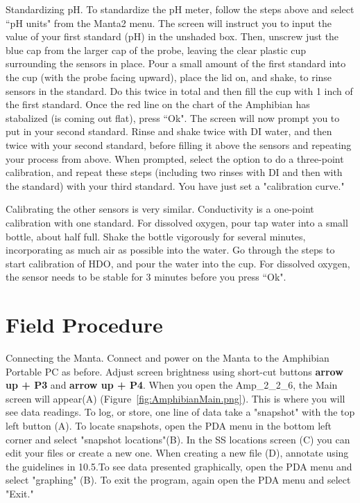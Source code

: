 \documentclass[12pt]{../SOP3_beta}\usepackage[]{graphicx}\usepackage[]{color}
\begin{document}
\NP Standardizing pH. To standardize the pH meter, follow the steps above and select ``pH units" from the Manta2 menu. The screen will instruct you to input the value of your first standard (pH) in the unshaded box. Then, unscrew just the blue cap from the larger cap of the probe, leaving the clear plastic cup surrounding the sensors in place. Pour a small amount of the first standard into the cup (with the probe facing upward), place the lid on, and shake, to rinse sensors in the standard. Do this twice in total and then fill the cup with 1 inch of the first standard. Once the red line on the chart of the Amphibian has stabalized (is coming out flat), press ``Ok". The screen will now prompt you to put in your second standard. Rinse and shake twice with DI water, and then twice with your second standard, before filling it above the sensors and repeating your process from above. When prompted, select the option to do a three-point calibration, and repeat these steps (including two rinses with DI and then with the standard) with your third standard. You have just set a "calibration curve."

\NP Calibrating the other sensors is very similar. Conductivity is a one-point calibration with one standard. For dissolved oxygen, pour tap water into a small bottle, about half full. Shake the bottle vigorously for several minutes, incorporating as much air as possible into the water. Go through the steps to start calibration of HDO, and pour the water into the cup. For dissolved oxygen, the sensor needs to be stable for 3 minutes before you press ``Ok". 

\section{Field Procedure}

\NP Connecting the Manta. Connect and power on the Manta to the Amphibian Portable PC as before. Adjust screen brightness using short-cut buttons \textbf{arrow up + P3} and \textbf{arrow up + P4}. When you open the Amp\_2\_2\_6, the Main screen will appear(A) (Figure~\ref{fig:AmphibianMain.png}). This is where you will see data readings. To log, or store, one line of data take a "snapshot" with the top left button (A). To locate snapshots, open the PDA menu in the bottom left corner and select "snapshot locations"(B). In the SS locations screen (C) you can edit your files or create a new one. When creating a new file (D), annotate using the guidelines in 10.5.To see data presented graphically, open the PDA menu and select "graphing" (B). To exit the program, again open the PDA menu and select "Exit."
\end{document}
